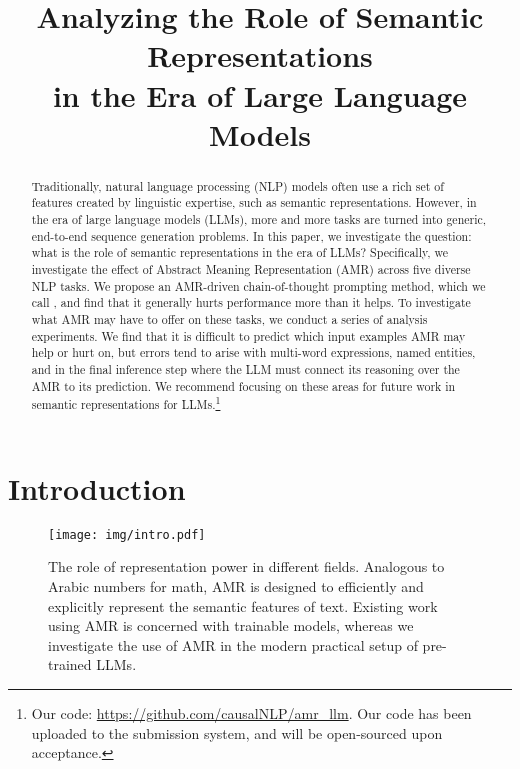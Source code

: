 
\title{
Analyzing the Role of
Semantic Representations \\
in the Era of Large Language Models
}
\maketitle
\begin{abstract}
Traditionally, natural language processing (NLP) models often use a rich set of features created by linguistic expertise, such as semantic representations. 
However, in the era of large language models (LLMs), more and more tasks are turned into generic, end-to-end sequence generation problems. In this paper, we investigate the question: what is the role of
semantic representations in the era of LLMs?
Specifically, we investigate the effect of Abstract Meaning Representation (AMR) across five diverse NLP tasks. We propose an AMR-driven chain-of-thought prompting method, which we call \ourmodel, and find that it generally hurts performance more than it helps.
To investigate what AMR may have to offer on these tasks, we conduct a series of analysis experiments. We find that it is difficult to predict which input examples AMR may help or hurt on, but errors tend to arise with multi-word expressions, named entities, and in the final inference step where the LLM must connect its reasoning over the AMR to its prediction. We recommend focusing on these areas for future work in semantic representations for LLMs.\footnote{\ifarxiv
Our code: {\href{https://github.com/causalNLP/amr_llm}{https://github.com/causalNLP/amr\_llm}}.
\else
Our code has been uploaded to the submission system, and will be open-sourced upon acceptance.
\fi
}

\end{abstract}

\section{Introduction}

\begin{figure}[ht]
    \centering
    \texttt{[image: img/intro.pdf]}
    \caption{
    The role of representation power in different fields. Analogous
    to Arabic numbers for math, AMR is designed to efficiently and explicitly represent the semantic features of text. Existing work using AMR is concerned with trainable models,
    whereas we investigate the use of AMR in the modern practical setup of pre-trained LLMs.
    }
    \label{fig:intro}
\end{figure}

